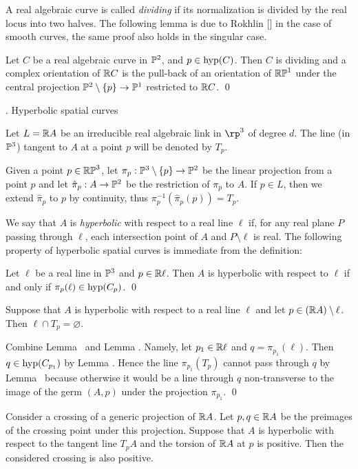 A real algebraic curve is called {\it dividing} if its normalization is
divided by the real locus into two halves.
%
The following lemma is due to Rokhlin [] in the case of smooth curves,
the same proof also holds in the singular case.

Let $C$ be a real algebraic curve in $\P^2$, and $p\in\hyp(C)$.
Then $C$ is dividing and a complex orientation of $\R C$ is the
pull-back of an orientation of $\RP^1$ under the central projection
$\P^2\setminus\{p\}\to\P^1$ restricted to $\R C$. \qed
\endproclaim


\subhead \sectHyperbSpa. Hyperbolic spatial curves
\endsubhead

Let $L=\R A$ be an irreducible real algebraic link in $\rp^3$ of degree $d$.
The line (in $\P^3$) tangent to $A$ at a point $p$ will be denoted by $T_p$.

Given a point $p\in\RP^3$,
let $\pi_p:\P^3\setminus\{p\}\to\P^2$ be the linear projection from a point $p$ and
let $\hat\pi_p:A\to\P^2$ be the restriction of $\pi_p$ to $A$. 
If $p\in L$, then we extend $\hat\pi_p$ to $p$
by continuity, thus $\pi_p^{-1}(\hat\pi_p(p))=T_p$.

We say that $A$ is {\it hyperbolic} with respect to a real line $\ell$ if, for
any real plane $P$ passing through $\ell$, each intersection point of $A$ and $P\setminus\ell$ is real.
The following property of hyperbolic spatial curves is immediate from the definition:

Let $\ell$ be a real line in $\P^3$ and $p\in\R\ell$. Then
$A$ is hyperbolic with respect to $\ell$ if and only if
$\pi_p(\ell)\in\hyp(C_p)$. \qed
\endproclaim

Suppose that $A$ is hyperbolic with respect to a real line $\ell$ and let
$p\in(\R A)\setminus\ell$. Then $\ell\cap T_p=\varnothing$.
\endproclaim

Combine Lemma \lemHypC\ and Lemma \lemHypKC.
Namely, let $p_1\in\R\ell$ and $q=\pi_{p_1}(\ell)$. Then $q\in\hyp(C_{p_1})$ by Lemma \lemHypKC.
Hence the line $\pi_{p_1}(T_p)$ cannot pass through $q$ by Lemma \lemHypC\ because
otherwise it would be a line through $q$ non-transverse to the image of the germ $(A,p)$
under the projection $\pi_{p_1}$.
\qed\enddemo

Consider a crossing of a generic projection of $\R A$.
Let $p,q\in\R A$ be the preimages of the crossing point under this projection.
Suppose that $A$ is hyperbolic with respect to the tangent line $T_p A$ and
the torsion of $\R A$ at $p$ is positive.
Then the considered crossing is also positive.
\endproclaim


